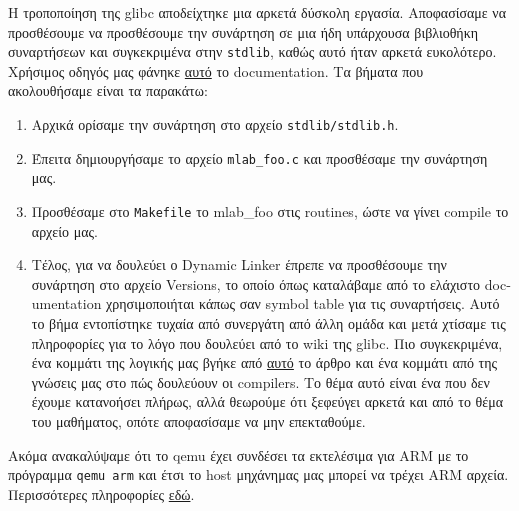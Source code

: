 \documentclass{article}
\newcommand{\english}[1]{\foreignlanguage{english}{{#1}}}
\begin{document}
Η τροποποίηση της \english{glibc} αποδείχτηκε μια αρκετά δύσκολη εργασία. Αποφασίσαμε να προσθέσουμε να προσθέσουμε την συνάρτηση σε μια ήδη υπάρχουσα βιβλιοθήκη συναρτήσεων και συγκεκριμένα στην \english{\texttt{stdlib}}, καθώς αυτό ήταν αρκετά ευκολότερο. Χρήσιμος οδηγός μας φάνηκε \href{https://github.com/rishiba/doc_syscalls/blob/master/doc/03_glibc.rst}{αυτό} το \english{documentation}. Τα βήματα που ακολουθήσαμε είναι τα παρακάτω:
\begin{enumerate}
  \item Αρχικά ορίσαμε την συνάρτηση στο αρχείο \english{\texttt{stdlib/stdlib.h}}. 
  \item Έπειτα δημιουργήσαμε το αρχείο \english{\texttt{mlab\_foo.c}} και προσθέσαμε την συνάρτηση μας.
  \item Προσθέσαμε στο \english{\texttt{Makefile}} το \english{mlab\_foo} στις \english{routines}, ώστε να γίνει \english{compile} το αρχείο μας.
  \item Τέλος, για να δουλεύει ο \english{Dynamic Linker} έπρεπε να προσθέσουμε την συνάρτηση στο αρχείο \english{Versions}, το οποίο όπως καταλάβαμε από το ελάχιστο \english{documentation} χρησιμοποιήται κάπως σαν \english{symbol table} για τις συναρτήσεις. Αυτό το βήμα εντοπίστηκε τυχαία από συνεργάτη από άλλη ομάδα και μετά χτίσαμε τις πληροφορίες για το λόγο που δουλεύει από το \english{wiki} της \english{glibc}. Πιο συγκεκριμένα, ένα κομμάτι της λογικής μας βγήκε από \href{https://sourceware.org/glibc/wiki/Development/Versioning_A_Structure}{αυτό} το άρθρο και ένα κομμάτι από της γνώσεις μας στο πώς δουλεύουν οι \english{compilers}. Το θέμα αυτό είναι ένα που δεν έχουμε κατανοήσει πλήρως, αλλά θεωρούμε ότι ξεφεύγει αρκετά και από το θέμα του μαθήματος, οπότε αποφασίσαμε να μην επεκταθούμε.
\end{enumerate}

Ακόμα ανακαλύψαμε ότι το \english{qemu} έχει συνδέσει τα εκτελέσιμα για \english{ARM} με το πρόγραμμα \english{\texttt{qemu arm}} και έτσι το \english{host} μηχάνημας μας μπορεί να τρέχει \english{ARM} αρχεία. Περισσότερες πληροφορίες \href{https://stackoverflow.com/questions/37912290/arm-linux-executable-mysteriously-runs-on-x86-64}{εδώ}.
\end{document}
